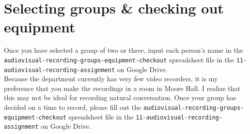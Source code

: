 \documentclass{article}
\newenvironment{myenv}[1]
  {\mdfsetup{
    frametitle={\colorbox{white}{\space#1\space}},
    innertopmargin=10pt,
    frametitleaboveskip=-\ht\strutbox,
    frametitlealignment=\center
    }
  \begin{mdframed}%
  }
  {\end{mdframed}}
\begin{document}
\section{Selecting groups \& checking out equipment}
Once you have selected a group of two or three, input each person's name in the \texttt{audiovisual\--recording\--groups\--equipment\--checkout} spreadsheet file in the \texttt{11\--audiovisual\--recording\--assignment} on Google Drive.\\

\noindent Because the department currently has very few video recorders, it is my preference that you make the recordings in a room in Moore Hall. I realize that this may not be ideal for recording natural conversation. Once your group has decided on a time to record, please fill out the \texttt{audiovisual\--recording\--groups\--equipment\--checkout} spreadsheet file in the \texttt{11\--audiovisual\--recording\--assignment} on Google Drive.

%
\end{document}

